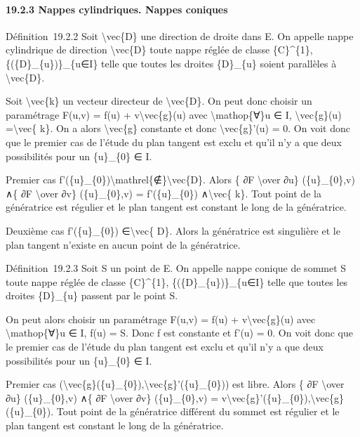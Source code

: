 \documentclass[]{article}
\begin{document}
\paragraph{19.2.3 Nappes cylindriques. Nappes coniques}

Définition~19.2.2 Soit \textbackslash{}vec\{D\} une direction de droite
dans E. On appelle nappe cylindrique de direction
\textbackslash{}vec\{D\} toute nappe réglée de classe \{C\}\^{}\{1\},
\{(\{D\}\_\{u\})\}\_\{u∈I\} telle que toutes les droites \{D\}\_\{u\}
soient parallèles à \textbackslash{}vec\{D\}.

Soit \textbackslash{}vec\{k\} un vecteur directeur de
\textbackslash{}vec\{D\}. On peut donc choisir un paramétrage F(u,v) =
f(u) + v\textbackslash{}vec\{g\}(u) avec \textbackslash{}mathop\{∀\}u ∈
I, \textbackslash{}vec\{g\}(u) =\textbackslash{}vec\{ k\}. On a alors
\textbackslash{}vec\{g\} constante et donc \textbackslash{}vec\{g\}'(u)
= 0. On voit donc que le premier cas de l'étude du plan tangent est
exclu et qu'il n'y a que deux possibilités pour un \{u\}\_\{0\} ∈ I.

Premier cas
f'(\{u\}\_\{0\})\textbackslash{}mathrel\{∉\}\textbackslash{}vec\{D\}.
Alors \{ ∂F \textbackslash{}over ∂u\} (\{u\}\_\{0\},v) ∧\{ ∂F
\textbackslash{}over ∂v\} (\{u\}\_\{0\},v) = f'(\{u\}\_\{0\})
∧\textbackslash{}vec\{ k\}. Tout point de la génératrice est régulier et
le plan tangent est constant le long de la génératrice.

Deuxième cas f'(\{u\}\_\{0\}) ∈\textbackslash{}vec\{ D\}. Alors la
génératrice est singulière et le plan tangent n'existe en aucun point de
la génératrice.

Définition~19.2.3 Soit S un point de E. On appelle nappe conique de
sommet S toute nappe réglée de classe \{C\}\^{}\{1\},
\{(\{D\}\_\{u\})\}\_\{u∈I\} telle que toutes les droites \{D\}\_\{u\}
passent par le point S.

On peut alors choisir un paramétrage F(u,v) = f(u) +
v\textbackslash{}vec\{g\}(u) avec \textbackslash{}mathop\{∀\}u ∈ I, f(u)
= S. Donc f est constante et f'(u) = 0. On voit donc que le premier cas
de l'étude du plan tangent est exclu et qu'il n'y a que deux
possibilités pour un \{u\}\_\{0\} ∈ I.

Premier cas
(\textbackslash{}vec\{g\}(\{u\}\_\{0\}),\textbackslash{}vec\{g\}'(\{u\}\_\{0\}))
est libre. Alors \{ ∂F \textbackslash{}over ∂u\} (\{u\}\_\{0\},v) ∧\{ ∂F
\textbackslash{}over ∂v\} (\{u\}\_\{0\},v) =
v\textbackslash{}vec\{g\}'(\{u\}\_\{0\}),\textbackslash{}vec\{g\}(\{u\}\_\{0\}).
Tout point de la génératrice différent du sommet est régulier et le plan
tangent est constant le long de la génératrice.
\end{document}
